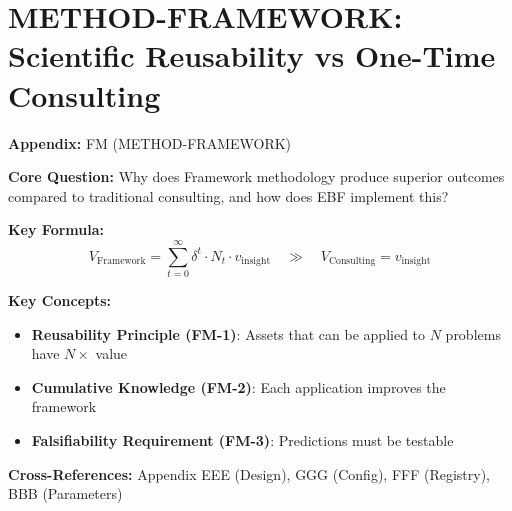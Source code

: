 \chapter{METHOD-FRAMEWORK: Scientific Reusability vs One-Time Consulting}
\label{app:method-framework}


\begin{tcolorbox}[colback=blue!5!white, colframe=blue!75!black,
    title=Quick Reference: Appendix FM]

\textbf{Appendix:} FM (METHOD-FRAMEWORK)

\textbf{Core Question:} Why does Framework methodology produce superior outcomes compared to traditional consulting, and how does EBF implement this?

\textbf{Key Formula:}
\begin{equation}
V_{\text{Framework}} = \sum_{t=0}^{\infty} \delta^t \cdot N_t \cdot v_{\text{insight}} \quad \gg \quad V_{\text{Consulting}} = v_{\text{insight}}
\label{eq:fm-value}
\end{equation}

\textbf{Key Concepts:}
\begin{itemize}[nosep]
\item \textbf{Reusability Principle (FM-1)}: Assets that can be applied to $N$ problems have $N \times$ value
\item \textbf{Cumulative Knowledge (FM-2)}: Each application improves the framework
\item \textbf{Falsifiability Requirement (FM-3)}: Predictions must be testable
\end{itemize}

\textbf{Cross-References:} Appendix EEE (Design), GGG (Config), FFF (Registry), BBB (Parameters)
\end{tcolorbox}

\begin{abstract}
This appendix addresses a fundamental methodological question: Why do 80\% of consulting insights disappear after implementation, while scientific knowledge accumulates over centuries? We identify five principles that distinguish Framework methodology from traditional consulting: (1) Reusability, (2) Transparency, (3) Cumulative Growth, (4) Falsifiability, and (5) Transferability. We show how EBF implements these principles through its 10C architecture, model registry, and parameter database, creating a self-improving system where each client engagement strengthens the overall framework.
\end{abstract}


